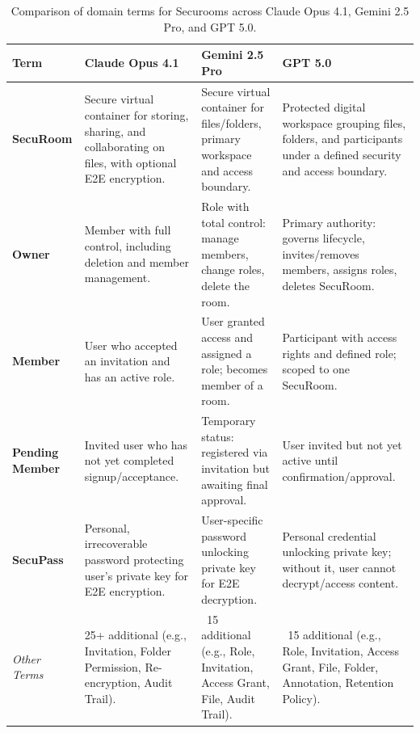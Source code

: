 \begin{table}[htbp]
    \centering
    \begin{adjustbox}{max width=\textwidth}
    \begin{tabular}{|p{2.5cm}|p{4cm}|p{4cm}|p{4cm}|}
    \hline
    \rowcolor{gray!20}
    \textbf{Term} & \textbf{Claude Opus 4.1} & \textbf{Gemini 2.5 Pro} & \textbf{GPT 5.0} \\
    \hline
    \textbf{SecuRoom} & 
    Secure virtual container for storing, sharing, and collaborating on files, with optional E2E encryption. &
    Secure virtual container for files/folders, primary workspace and access boundary. &
    Protected digital workspace grouping files, folders, and participants under a defined security and access boundary. \\
    \hline
    \textbf{Owner} & 
    Member with full control, including deletion and member management. &
    Role with total control: manage members, change roles, delete the room. &
    Primary authority: governs lifecycle, invites/removes members, assigns roles, deletes SecuRoom. \\
    \hline
    \textbf{Member} & 
    User who accepted an invitation and has an active role. &
    User granted access and assigned a role; becomes member of a room. &
    Participant with access rights and defined role; scoped to one SecuRoom. \\
    \hline
    \textbf{Pending Member} & 
    Invited user who has not yet completed signup/acceptance. &
    Temporary status: registered via invitation but awaiting final approval. &
    User invited but not yet active until confirmation/approval. \\
    \hline
    \textbf{SecuPass} & 
    Personal, irrecoverable password protecting user's private key for E2E encryption. &
    User-specific password unlocking private key for E2E decryption. &
    Personal credential unlocking private key; without it, user cannot decrypt/access content. \\
    \hline
    \rowcolor{gray!10}
    \textit{Other Terms} & 
    25+ additional (e.g., Invitation, Folder Permission, Re-encryption, Audit Trail). &
    ~15 additional (e.g., Role, Invitation, Access Grant, File, Audit Trail). &
    ~15 additional (e.g., Role, Invitation, Access Grant, File, Folder, Annotation, Retention Policy). \\
    \hline
    \end{tabular}
    \end{adjustbox}
    \caption{Comparison of domain terms for Securooms across Claude Opus 4.1, Gemini 2.5 Pro, and GPT 5.0.}
    \label{tab:securooms-ubiquitous-language}
\end{table}


